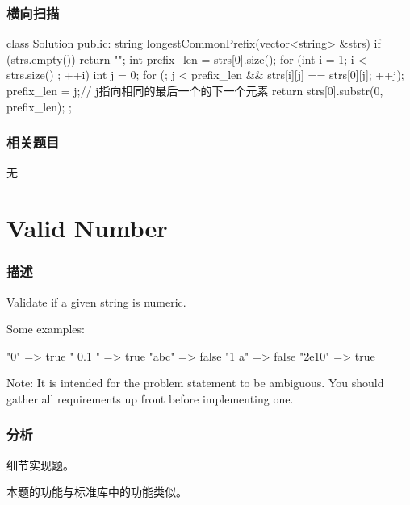\subsubsection{横向扫描}
\begin{Code}
class Solution {
public:
    string longestCommonPrefix(vector<string> &strs) {
        if (strs.empty()) {
            return "";
        }
        int prefix_len = strs[0].size();
        for (int i = 1; i < strs.size() ; ++i) {
            int j = 0;
            for (; j < prefix_len && strs[i][j] == strs[0][j]; ++j);
            prefix_len = j;// j指向相同的最后一个的下一个元素
        }
        return strs[0].substr(0, prefix_len);
    }
};
\end{Code}

\subsubsection{相关题目}
\begindot
\item 无
\myenddot


\section{Valid Number} %
\label{sec:valid-number}


\subsubsection{描述}
Validate if a given string is numeric.

Some examples:
\begin{Code}
"0" => true
" 0.1 " => true
"abc" => false
"1 a" => false
"2e10" => true
\end{Code}

Note: It is intended for the problem statement to be ambiguous. You should gather all requirements up front before implementing one.


\subsubsection{分析}
细节实现题。

本题的功能与标准库中的功能类似。


